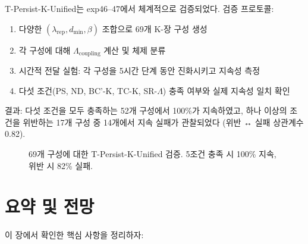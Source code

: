 T-Persist-K-Unified는 exp46--47에서 체계적으로 검증되었다. 검증 프로토콜:

\begin{enumerate}
    \item 다양한 $(\lambda_{\mathrm{rep}}, d_{\min}, \beta)$ 조합으로 69개 K-장 구성 생성
    \item 각 구성에 대해 $\Lambda_{\mathrm{coupling}}$ 계산 및 체제 분류
    \item 시간적 전달 실험: 각 구성을 5시간 단계 동안 진화시키고 지속성 측정
    \item 다섯 조건(PS, ND, BC'-K, TC-K, SR-$\Lambda$) 충족 여부와 실제 지속성 일치 확인
\end{enumerate}

결과: 다섯 조건을 모두 충족하는 52개 구성에서 100\%가 지속하였고, 하나 이상의 조건을 위반하는 17개 구성 중 14개에서 지속 실패가 관찰되었다 (위반 ↔ 실패 상관계수 0.82).

\begin{figure}[t]
\centering
{}
\caption{69개 구성에 대한 T-Persist-K-Unified 검증. 5조건 충족 시 100\% 지속, 위반 시 82\% 실패.}
\label{fig:persist-k-validation}
\end{figure}


\section{요약 및 전망}
\label{sec:multi-summary}

이 장에서 확인한 핵심 사항을 정리하자:

